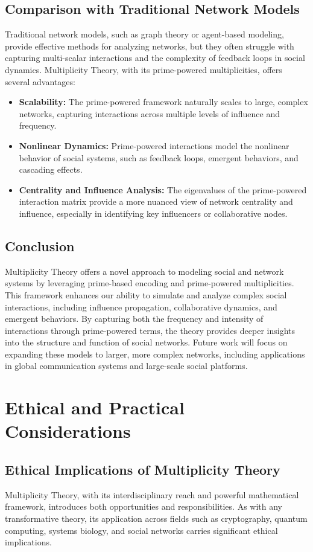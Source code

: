 \documentclass[%
 preprint, linenumbers,
 amsmath,amssymb,
 aps, physrev,
]{revtex4-2}
\begin{document}
\subsection{Comparison with Traditional Network Models}
Traditional network models, such as graph theory or agent-based modeling, provide effective methods for analyzing networks, but they often struggle with capturing multi-scalar interactions and the complexity of feedback loops in social dynamics. Multiplicity Theory, with its prime-powered multiplicities, offers several advantages:
\begin{itemize}
    \item \textbf{Scalability:} The prime-powered framework naturally scales to large, complex networks, capturing interactions across multiple levels of influence and frequency.
    \item \textbf{Nonlinear Dynamics:} Prime-powered interactions model the nonlinear behavior of social systems, such as feedback loops, emergent behaviors, and cascading effects.
    \item \textbf{Centrality and Influence Analysis:} The eigenvalues of the prime-powered interaction matrix provide a more nuanced view of network centrality and influence, especially in identifying key influencers or collaborative nodes.
\end{itemize}

\subsection{Conclusion}
Multiplicity Theory offers a novel approach to modeling social and network systems by leveraging prime-based encoding and prime-powered multiplicities. This framework enhances our ability to simulate and analyze complex social interactions, including influence propagation, collaborative dynamics, and emergent behaviors. By capturing both the frequency and intensity of interactions through prime-powered terms, the theory provides deeper insights into the structure and function of social networks. Future work will focus on expanding these models to larger, more complex networks, including applications in global communication systems and large-scale social platforms.
\section{Ethical and Practical Considerations}
\label{sec:EthicalPractical}

\subsection{Ethical Implications of Multiplicity Theory}
Multiplicity Theory, with its interdisciplinary reach and powerful mathematical framework, introduces both opportunities and responsibilities. As with any transformative theory, its application across fields such as cryptography, quantum computing, systems biology, and social networks carries significant ethical implications.
\end{document}
